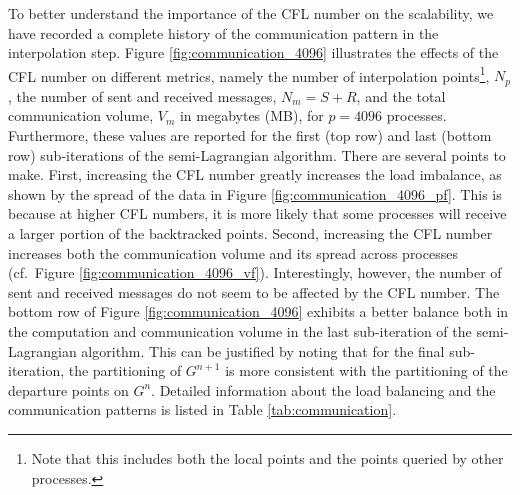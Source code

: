 To better understand the importance of the CFL number on the scalability, we have recorded a complete history of the communication pattern in the interpolation step. Figure \ref{fig:communication_4096} illustrates the effects of the CFL number on different metrics, namely the number of interpolation points\footnote{Note that this includes both the local points and the points queried by other processes.}, $N_p$, the number of sent and received messages, $N_m = S + R$, and the total communication volume, $V_m$ in megabytes (MB), for $p=4096$ processes. Furthermore, these values are reported for the first (top row) and last (bottom row) sub-iterations of the semi-Lagrangian algorithm. There are several points to make. First, increasing the CFL number greatly increases the load imbalance, as shown by the spread of the data in Figure \ref{fig:communication_4096_pf}. This is because at higher CFL numbers, it is more likely that some processes will receive a larger portion of the backtracked points. Second, increasing the CFL number increases both the communication volume and its spread across processes (cf.\ Figure \ref{fig:communication_4096_vf}). Interestingly, however, the number of sent and received messages do not seem to be affected by the CFL number. The bottom row of Figure \ref{fig:communication_4096} exhibits a better balance both in the computation and communication volume in the last sub-iteration of the semi-Lagrangian algorithm. This can be justified by noting that for the final sub-iteration, the partitioning of $G^{n+1}$ is more consistent with the partitioning of the departure points on $G^n$. Detailed information about the load balancing and the communication patterns is listed in Table \ref{tab:communication}.
